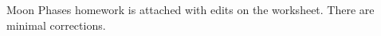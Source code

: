 \documentclass[../hw1.tex]{subfiles}
\begin{document}
    \newpage
        \onlyinsubfile{}
        \notinsubfile{}
        Moon Phases homework is attached with edits on the worksheet. There are minimal corrections.
\end{document}
